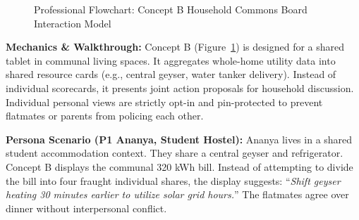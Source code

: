 \documentclass[12pt,a4paper]{article}
\begin{document}
\begin{figure}[ht]
\centering
{}
\caption{Professional Flowchart: Concept B Household Commons Board Interaction Model}
\label{fig:concept_b_flow}
\end{figure}

\textbf{Mechanics \& Walkthrough:} Concept B (Figure~\ref{fig:concept_b_flow}) is designed for a shared tablet in communal living spaces. It aggregates whole-home utility data into shared resource cards (e.g., central geyser, water tanker delivery). Instead of individual scorecards, it presents joint action proposals for household discussion. Individual personal views are strictly opt-in and pin-protected to prevent flatmates or parents from policing each other.

\textbf{Persona Scenario (P1 Ananya, Student Hostel):} Ananya lives in a shared student accommodation context. They share a central geyser and refrigerator. Concept B displays the communal 320 kWh bill. Instead of attempting to divide the bill into four fraught individual shares, the display suggests: ``\emph{Shift geyser heating 30 minutes earlier to utilize solar grid hours.}'' The flatmates agree over dinner without interpersonal conflict.
\end{document}

